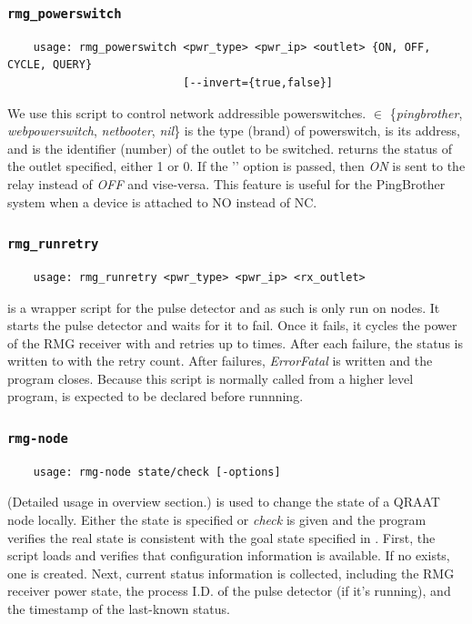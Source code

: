 \documentclass[letter]{article}
\begin{document}
  
\subsubsection{\texttt{rmg\_powerswitch}}
\begin{verbatim}
    usage: rmg_powerswitch <pwr_type> <pwr_ip> <outlet> {ON, OFF, CYCLE, QUERY} 
                           [--invert={true,false}]
\end{verbatim}
We use this script to control network addressible powerswitches.  $
\in$ \{\textit{pingbrother}, \textit{webpowerswitch}, \textit{netbooter}, \textit{nil}\} is the 
type (brand) of powerswitch,  is its address, and  is 
the identifier (number) of the outlet to be switched.  returns the status of the 
outlet specified, either 1 or 0. If the '' option is passed, then 
\textit{ON} is sent to the relay instead of \textit{OFF} and vise-versa. This feature is 
useful for the PingBrother system when a device is attached to NO instead of NC. 


\subsubsection{\texttt{rmg\_runretry}}
\begin{verbatim}
    usage: rmg_runretry <pwr_type> <pwr_ip> <rx_outlet>
\end{verbatim}
 is a wrapper script for the pulse detector and as such is only
run on nodes. It starts the pulse detector and waits for it to fail. Once it fails, 
it cycles the power of the RMG receiver with  and retries up 
to  times. After each failure, the status is written to 
with the retry count. After  failures, \textit{ErrorFatal} is written and 
the program closes. Because this script is normally called from a higher level
program,  is expected to be declared before runnning.

\subsubsection{\texttt{rmg-node}}
\begin{verbatim}
    usage: rmg-node state/check [-options]
\end{verbatim}
(Detailed usage in overview section.)  is used to change the state 
of a QRAAT node locally. Either the state is specified or \textit{check} is given and the
program verifies the real state is consistent with the goal state specified in 
. First, the script loads  and 
verifies that configuration information is available. If no  exists, 
one is created. Next, current status information is collected, including the RMG 
receiver power state, the process I.D. of the pulse detector (if it's running), and
the timestamp of the last-known status. 
\end{document}
